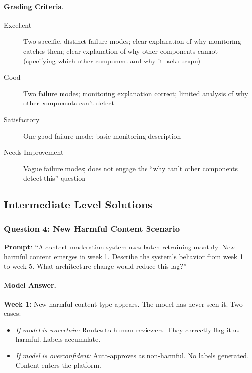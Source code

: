 \paragraph{Grading Criteria.}
\begin{description}
    \item[Excellent] Two specific, distinct failure modes; clear explanation of why monitoring catches them; clear explanation of why other components cannot (specifying which other component and why it lacks scope)
    \item[Good] Two failure modes; monitoring explanation correct; limited analysis of why other components can't detect
    \item[Satisfactory] One good failure mode; basic monitoring description
    \item[Needs Improvement] Vague failure modes; does not engage the ``why can't other components detect this'' question
\end{description}

\subsection{Intermediate Level Solutions}

\subsubsection{Question 4: New Harmful Content Scenario}

\textbf{Prompt:} ``A content moderation system uses batch retraining monthly. New harmful content emerges in week 1. Describe the system's behavior from week 1 to week 5. What architecture change would reduce this lag?''

\paragraph{Model Answer.}

\textbf{Week 1:} New harmful content type appears. The model has never seen it. Two cases:
\begin{itemize}
    \item \emph{If model is uncertain:} Routes to human reviewers. They correctly flag it as harmful. Labels accumulate.
    \item \emph{If model is overconfident:} Auto-approves as non-harmful. No labels generated. Content enters the platform.
\end{itemize}

